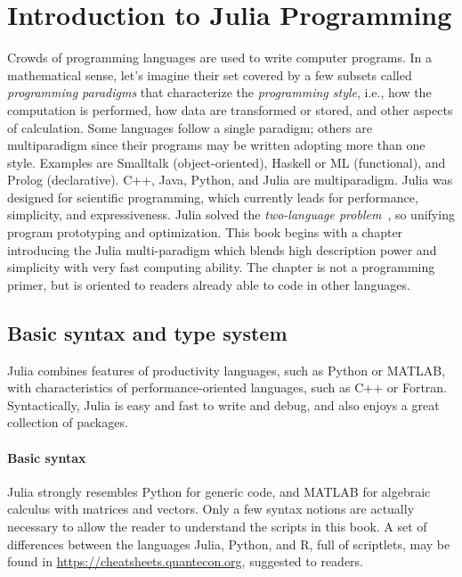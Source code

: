 
\chapter{Introduction to Julia Programming}\label{chapt:}

Crowds of programming languages are used to write computer programs. In a mathematical sense, let’s imagine their set covered by a few subsets called \emph{programming paradigms} that characterize the \emph{programming style}, i.e., how the computation is performed, how data are transformed or stored, and other aspects of calculation.
Some languages follow a single paradigm; others are multiparadigm since their programs may be written adopting more than one style. Examples are Smalltalk (object-oriented), Haskell or ML (functional), and Prolog (declarative). C++, Java, Python, and Julia are multiparadigm. 
Julia was designed for scientific programming, which currently leads for performance, simplicity, and expressiveness. Julia solved the \emph{two-language problem}~\cite{BEKS14}, so unifying program prototyping and optimization.
This book begins with a chapter introducing the Julia multi-paradigm which blends high description power and simplicity with very fast computing ability. The chapter is not a programming primer, but is oriented to readers already able to code in other languages.



\section{Basic syntax and type system}\label{sect:1-1}

Julia combines features of productivity languages, such as Python or MATLAB, with characteristics of performance-oriented languages, such as C++ or Fortran. Syntactically, Julia is easy and fast to write and debug, and also enjoys a great collection of packages.

\subsubsection*{Basic syntax}

Julia strongly resembles Python for generic code, and MATLAB for algebraic calculus with matrices and vectors. 
Only a few syntax notions are actually necessary to allow the reader to understand the scripts in this book.
A set of differences between the languages Julia, Python, and R, full of scriptlets, may be found in \href{https://cheatsheets.quantecon.org}{https://cheatsheets.quantecon.org}, suggested to readers.

